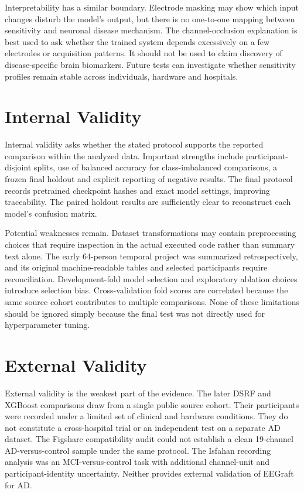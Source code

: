 Interpretability has a similar boundary. Electrode masking may show which input changes disturb the model's output, but there is no one-to-one mapping between sensitivity and neuronal disease mechanism. The channel-occlusion explanation is best used to ask whether the trained system depends excessively on a few electrodes or acquisition patterns. It should not be used to claim discovery of disease-specific brain biomarkers. Future tests can investigate whether sensitivity profiles remain stable across individuals, hardware and hospitals.

\section{Internal Validity}
Internal validity asks whether the stated protocol supports the reported comparison within the analyzed data. Important strengths include participant-disjoint splits, use of balanced accuracy for class-imbalanced comparisons, a frozen final holdout and explicit reporting of negative results. The final protocol records pretrained checkpoint hashes and exact model settings, improving traceability. The paired holdout results are sufficiently clear to reconstruct each model's confusion matrix.

Potential weaknesses remain. Dataset transformations may contain preprocessing choices that require inspection in the actual executed code rather than summary text alone. The early 64-person temporal project was summarized retrospectively, and its original machine-readable tables and selected participants require reconciliation. Development-fold model selection and exploratory ablation choices introduce selection bias. Cross-validation fold scores are correlated because the same source cohort contributes to multiple comparisons. None of these limitations should be ignored simply because the final test was not directly used for hyperparameter tuning.

\section{External Validity}
External validity is the weakest part of the evidence. The later DSRF and XGBoost comparisons draw from a single public source cohort. Their participants were recorded under a limited set of clinical and hardware conditions. They do not constitute a cross-hospital trial or an independent test on a separate AD dataset. The Figshare compatibility audit could not establish a clean 19-channel AD-versus-control sample under the same protocol. The Isfahan recording analysis was an MCI-versus-control task with additional channel-unit and participant-identity uncertainty. Neither provides external validation of EEGraft for AD.

